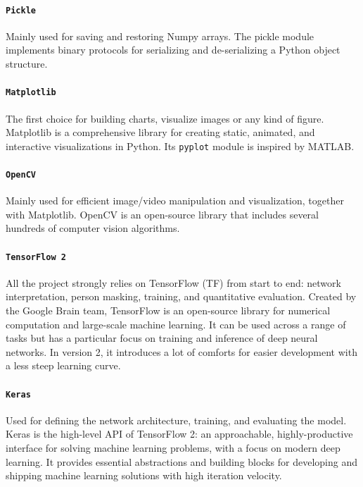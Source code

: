\paragraph*{\texttt{Pickle}}
Mainly used for saving and restoring Numpy arrays. The pickle module implements binary protocols for serializing and de-serializing a Python object structure. 

\paragraph*{\texttt{Matplotlib}}
The first choice for building charts, visualize images or any kind of figure. Matplotlib is a comprehensive library for creating static, animated, and interactive visualizations in Python. Its \texttt{pyplot} module is inspired by MATLAB.

\paragraph*{\texttt{OpenCV}}
Mainly used for efficient image/video manipulation and visualization, together with Matplotlib. OpenCV is an open-source library that includes several hundreds of computer vision algorithms.

\paragraph*{\texttt{TensorFlow 2}}
All the project strongly relies on TensorFlow (TF) from start to end: network interpretation, person masking, training, and quantitative evaluation. Created by the Google Brain team, TensorFlow is an open-source library for numerical computation and large-scale machine learning. It can be used across a range of tasks but has a particular focus on training and inference of deep neural networks. In version 2, it introduces a lot of comforts for easier development with a less steep learning curve.

\paragraph*{\texttt{Keras}}
Used for defining the network architecture, training, and evaluating the model. Keras is the high-level API of TensorFlow 2: an approachable, highly-productive interface for solving machine learning problems, with a focus on modern deep learning. It provides essential abstractions and building blocks for developing and shipping machine learning solutions with high iteration velocity.

